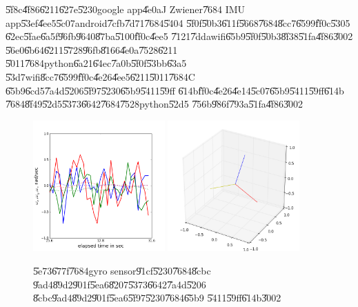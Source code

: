 \U{5f8c}\U{4f86}\U{6211}\U{627e}\U{5230}google app\U{4e0a}J Zwiener\U{7684}%
IMU app\U{53ef}\U{4ee5}\U{5c07}android\U{7cfb}\U{7d71}\U{7684}\U{5404}%
\U{5f0f}\U{50b3}\U{611f}\U{5668}\U{7684}\U{8cc7}\U{6599}\U{ff0c}\U{5305}%
\U{62ec}\U{5fae}\U{6a5f}\U{96fb}\U{9640}\U{87ba}\U{5100}\U{ff0c}\U{4ee5}%
\U{7121}\U{7dda}wifi\U{65b9}\U{5f0f}\U{50b3}\U{8f38}\U{51fa}\U{4f86}\U{3002}%
\U{56e0}\U{6b64}\U{6211}\U{5728}\U{96fb}\U{8166}\U{4e0a}\U{7528}\U{6211}%
\U{5011}\U{7684}python\U{6a21}\U{64ec}\U{7a0b}\U{5f0f}\U{53bb}\U{63a5}%
\U{53d7}wifi\U{8cc7}\U{6599}\U{ff0c}\U{4e26}\U{4ee5}\U{6211}\U{5011}\U{7684}C%
\U{65b9}\U{6cd5}\U{7a4d}\U{5206}\U{5f97}\U{5230}\U{65b9}\U{5411}\U{59ff}%
\U{614b}\U{ff0c}\U{4e26}\U{4e14}\U{5c07}\U{65b9}\U{5411}\U{59ff}\U{614b}%
\U{7684}\U{8f49}\U{52d5}\U{5373}\U{6642}\U{7684}\U{7528}python\U{52d5}%
\U{756b}\U{986f}\U{793a}\U{51fa}\U{4f86}\U{3002}\newline
\begin{figure}[th]
\caption{\U{5e73}\U{677f}\U{7684}gyro sensor\U{91cf}\U{5230}\U{7684}\U{8cbc}%
\U{9ad4}\U{89d2}\U{901f}\U{5ea6}\U{8207}\U{5373}\U{6642}\U{7a4d}\U{5206}%
\U{8cbc}\U{9ad4}\U{89d2}\U{901f}\U{5ea6}\U{5f97}\U{5230}\U{7684}\U{65b9}%
\U{5411}\U{59ff}\U{614b}\U{3002}}
\begin{center}
\includegraphics[width=0.45\textwidth]{./figs/Zwiener_1.png}%
\includegraphics[width=0.45\textwidth]{./figs/Zwiener_2.png}
\end{center}
\end{figure}
